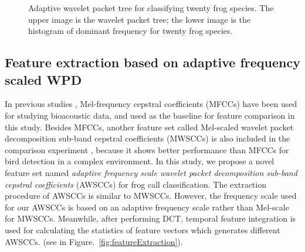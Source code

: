 \begin{figure}[htb!] %
\caption[Adaptive wavelet packet tree for classifying twenty frog species]{Adaptive wavelet packet tree for classifying twenty frog species. The upper image is the wavelet packet tree; the lower image is the histogram of dominant frequency for twenty frog species.}
\label{fig:tree20} 
\end{figure}



\subsection{Feature extraction based on adaptive frequency scaled WPD}

In previous studies \citep{bedoya2014automatic, Xie1504:Acoustic}, Mel-frequency cepstral coefficients (MFCCs) have been used for studying bioacoustic data, and used as the baseline for feature comparison in this study. Besides MFCCs, another feature set called Mel-scaled wavelet packet decomposition sub-band cepstral coefficients (MWSCCs) is also included in the comparison experiment \citep{Zhang2015108}, because it shows better performance than MFCCs for bird detection in a complex environment. In this study, we propose a novel feature set named \textit{adaptive frequency scale wavelet packet decomposition sub-band cepstral coefficients} (AWSCCs) for frog call classification.
The extraction procedure of AWSCCs is similar to MWSCCs. However, the frequency scale used for our AWSCCs is based on an adaptive frequency scale rather than Mel-scale for MWSCCs. Meanwhile, after performing DCT, temporal feature integration is used for calculating the statistics of feature vectors which generates different AWSCCs. (see in Figure.~\ref{fig:featureExtraction}). 


